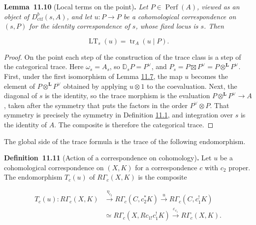 \documentclass[11pt]{article}
\newenvironment{bpstatement}[2]{\par\addvspace{0.6\baselineskip}\noindent\textbf{#1}#2\textbf{.}\enspace\ignorespaces}
  {\par\addvspace{0.4\baselineskip}}
\newenvironment{bpstatementit}[2]{\begin{bpstatement}{#1}{#2}\itshape\ignorespaces}{\end{bpstatement}}
\begin{document}
\label{bp30}%
\begin{bpstatementit}{Lemma~11.10}{ (Local terms on the point)}
Let \(P\in\operatorname{Perf}(A)\), viewed as an object of \(D^b_{\mathrm{ctf}}(s,A)\), and let \(u:P\to P\) be a cohomological correspondence on \((s,P)\) for the identity correspondence of \(s\), whose fixed locus is \(s\). Then

\[
\operatorname{LT}_s(u)=\operatorname{tr}_A(u\mid P).
\]
\end{bpstatementit}

\begin{proof}[{Proof}]\label{bp31}%
On the point each step of the construction of the trace class is a step of the categorical trace. Here \(\omega_s=A_s\), so \(\mathbb D_sP=P^\vee\), and \(P_s=P\boxtimes
P^\vee=P\otimes^{\mathbf L}P^\vee\). First, under the first isomorphism of Lemma \hyperref[bp22]{11.7}, the map \(u\) becomes the element of \(P\otimes^{\mathbf L}P^\vee\) obtained by applying \(u\otimes1\) to the coevaluation. Next, the diagonal of \(s\) is the identity, so the trace morphism is the evaluation \(P\otimes^{\mathbf L}P^\vee\to A\), taken after the symmetry that puts the factors in the order \(P^\vee\otimes P\). That symmetry is precisely the symmetry in Definition \hyperref[bp5]{11.1}, and integration over \(s\) is the identity of \(A\). The composite is therefore the categorical trace.
\end{proof}

\label{bp32}%
The global side of the trace formula is the trace of the following endomorphism.

\label{bp33}%
\begin{bpstatement}{Definition~11.11}{ (Action of a correspondence on cohomology)}
Let \(u\) be a cohomological correspondence on \((X,K)\) for a correspondence \(c\) with \(c_2\) proper. The endomorphism \(T_c(u)\) of \(R\Gamma_c(X,K)\) is the composite

\[
\begin{aligned}
T_c(u):R\Gamma_c(X,K)&\xrightarrow{\eta_{c_2}}
R\Gamma_c(C,c_2^*K)\xrightarrow{u}R\Gamma_c(C,c_1^!K)\\
&\simeq R\Gamma_c(X,Rc_{1!}c_1^!K)
\xrightarrow{\varepsilon_{c_1}}R\Gamma_c(X,K).
\end{aligned}
\]
\end{bpstatement}
\end{document}
